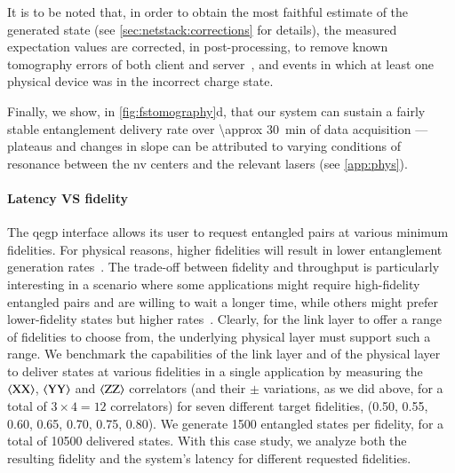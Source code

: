 It is to be noted that, in order to obtain the most faithful estimate of the generated state
(see \cref{sec:netstack:corrections} for details), the measured expectation values are corrected, in
post-processing, to remove known tomography errors of both client and
server~\cite{nachman_2020_unfolding}, and events in which at least one physical device was in the
incorrect charge state.

Finally, we show, in \cref{fig:fstomography}d, that our system can sustain a fairly stable
entanglement delivery rate over \qty{\approx 30}{min} of data acquisition --- plateaus and changes
in slope can be attributed to varying conditions of resonance between the \acrshort{nv} centers and
the relevant lasers (see \cref{app:phys}).

\paragraph{Latency VS fidelity}

The \acrshort{qegp} interface allows its user to request entangled pairs at various minimum
fidelities. For physical reasons, higher fidelities will result in lower entanglement generation
rates~\cite{stockill_2017_phasetuned, humphreys_2018_delivery}. The trade-off between fidelity and
throughput is particularly interesting in a scenario where some applications might require
high-fidelity entangled pairs and are willing to wait a longer time, while others might prefer
lower-fidelity states but higher rates~\cite{dahlberg_2019_egp}. Clearly, for the link layer to
offer a range of fidelities to choose from, the underlying physical layer must support such a range.
We benchmark the capabilities of the link layer and of the physical layer to deliver states at
various fidelities in a single application by measuring the $\braket{\mathrm{XX}}$,
$\braket{\mathrm{YY}}$ and $\braket{\mathrm{ZZ}}$ correlators (and their $\pm$ variations, as we did
above, for a total of $3 \times 4 = 12$ correlators) for seven different target fidelities,
(\num{0.50}, \num{0.55}, \num{0.60}, \num{0.65}, \num{0.70}, \num{0.75}, \num{0.80}). We generate
\num{1500} entangled states per fidelity, for a total of \num{10500} delivered states. With this
case study, we analyze both the resulting fidelity and the system's latency for different requested
fidelities.

